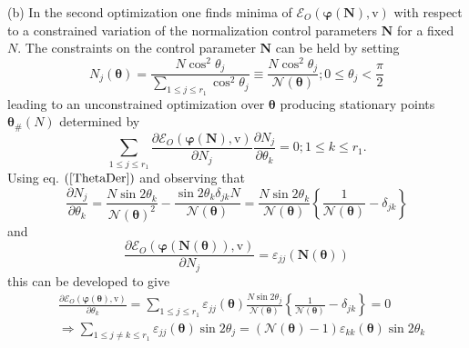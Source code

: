 \documentclass[aps,preprint]{revtex4}%
\begin{document}
(b) In the second optimization one finds minima of $\mathcal{E}_{O}\left(
\boldsymbol{\varphi}\left(  \boldsymbol{N}\right)  \boldsymbol{,}%
\mathrm{v}\right)  $ with respect to a constrained variation of the
normalization control parameters $\boldsymbol{N}$ for a fixed $N$. The
constraints on the control parameter $\boldsymbol{N}$ can be held by setting
\begin{equation}
N_{j}\left(  \boldsymbol{\theta}\right)  =\frac{N\cos^{2}\theta_{j}}%
{\sum\limits_{1\leq j\leq r_{1}}\cos^{2}\theta_{j}}\equiv\frac{N\cos^{2}%
\theta_{j}}{\mathcal{N}\left(  \boldsymbol{\theta}\right)  };0\leq\theta
_{j}<\frac{\pi}{2}%
\end{equation}
leading to an unconstrained optimization over $\boldsymbol{\theta}$ producing
stationary points $\boldsymbol{\theta}_{\#}\left(  N\right)  $ determined by
\begin{equation}
\sum\limits_{1\leq j\leq r_{1}}\frac{\partial\mathcal{E}_{O}\left(
\boldsymbol{\varphi}\left(  \boldsymbol{N}\right)  \boldsymbol{,}%
\mathrm{v}\right)  }{\partial N_{j}}\frac{\partial N_{j}}{\partial\theta_{k}%
}=0;1\leq k\leq r_{1}. \label{ThetaDer}%
\end{equation}
Using eq. $\left(  \ref{ThetaDer}\right)  $ and observing that
\begin{equation}
\frac{\partial N_{j}}{\partial\theta_{k}}=\frac{N\sin2\theta_{k}}%
{\mathcal{N}\left(  \boldsymbol{\theta}\right)  ^{2}}-\frac{\sin2\theta
_{k}\delta_{jk}N}{\mathcal{N}\left(  \boldsymbol{\theta}\right)  }=\frac
{N\sin2\theta_{k}}{\mathcal{N}\left(  \boldsymbol{\theta}\right)  }\left\{
\frac{1}{\mathcal{N}\left(  \boldsymbol{\theta}\right)  }-\delta_{jk}\right\}
\end{equation}
and
\begin{equation}
\frac{\partial\mathcal{E}_{O}\left(  \boldsymbol{\varphi}\left(
\boldsymbol{N}\left(  \boldsymbol{\theta}\right)  \right)  \boldsymbol{,}%
\mathrm{v}\right)  }{\partial N_{j}}=\varepsilon_{jj}\left(  \boldsymbol{N}%
\left(  \boldsymbol{\theta}\right)  \right)
\end{equation}
this can be developed to give
\begin{align}
&  \frac{\partial\mathcal{E}_{O}\left(  \boldsymbol{\varphi}\left(
\boldsymbol{\theta}\right)  \boldsymbol{,}\mathrm{v}\right)  }{\partial
\theta_{k}}=\sum\limits_{1\leq j\leq r_{1}}\varepsilon_{jj}\left(
\boldsymbol{\theta}\right)  \frac{N\sin2\theta_{j}}{\mathcal{N}\left(
\boldsymbol{\theta}\right)  }\left\{  \frac{1}{\mathcal{N}\left(
\boldsymbol{\theta}\right)  }-\delta_{jk}\right\}  =0\nonumber\\
&  \Rightarrow\sum\limits_{1\leq j\neq k\leq r_{1}}\varepsilon_{jj}\left(
\boldsymbol{\theta}\right)  \sin2\theta_{j}=\left(  \mathcal{N}\left(
\boldsymbol{\theta}\right)  -1\right)  \varepsilon_{kk}\left(
\boldsymbol{\theta}\right)  \sin2\theta_{k} \label{Theta}%
\end{align}
\end{document}
